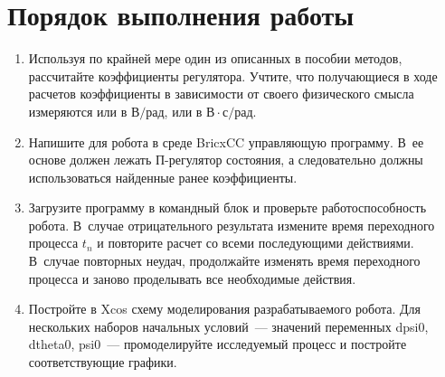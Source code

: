 \documentclass[12pt,a4paper,openany]{extarticle}
\begin{document}
\section{Порядок выполнения работы}
\begin{enumerate}
	\item Используя по крайней мере один из описанных в пособии методов, рассчитайте коэффициенты регулятора.
	Учтите, что получающиеся в ходе расчетов коэффициенты в зависимости от своего физического смысла измеряются или в $\text{В}/\text{рад}$, или в $\text{В}\cdot\text{с}/\text{рад}$.
	\item Напишите для робота в среде BricxCC управляющую программу.
	В~ее основе должен лежать П-регулятор состояния, а следовательно должны использоваться найденные ранее коэффициенты.
	\item Загрузите программу в командный блок и проверьте работоспособность робота.
	В~случае отрицательного результата измените время переходного процесса $t_n$ и повторите расчет со всеми последующими действиями.
	В~случае повторных неудач, продолжайте изменять время переходного процесса и заново проделывать все необходимые действия.
	\item Постройте в Xcos схему моделирования разрабатываемого робота.
	Для нескольких наборов начальных условий~--- значений переменных dpsi0, dtheta0, psi0~--- промоделируйте исследуемый процесс и постройте соответствующие графики.
\end{enumerate}
\end{document}
